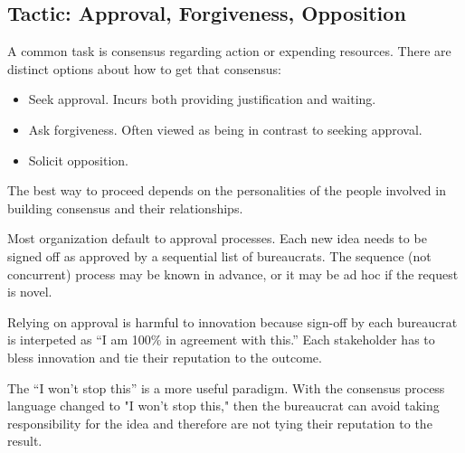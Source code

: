 \subsection{Tactic: Approval, Forgiveness, Opposition}

A common task is consensus regarding action or expending resources. There are distinct options about how to get that consensus:
\begin{itemize}
    \item Seek approval. Incurs both providing justification and waiting.
    \item Ask forgiveness. Often viewed as being in contrast to seeking approval. 
    \item Solicit opposition. 
\end{itemize}
The best way to proceed depends on the personalities of the people involved in building consensus and their relationships. 

Most organization default to approval processes. Each new idea needs to be signed off as approved by a sequential list of bureaucrats. The sequence (not concurrent) process may be known in advance, or it may be ad hoc if the request is novel.

Relying on approval is harmful to innovation because sign-off by each bureaucrat is interpeted as ``I am 100\% in agreement with this.'' Each stakeholder has to bless innovation and tie their reputation to the outcome.

The ``I won't stop this'' is a more useful paradigm. With the consensus process language changed to "I won't stop this," then the bureaucrat can avoid taking responsibility for the idea and therefore are not tying their reputation to the result.

